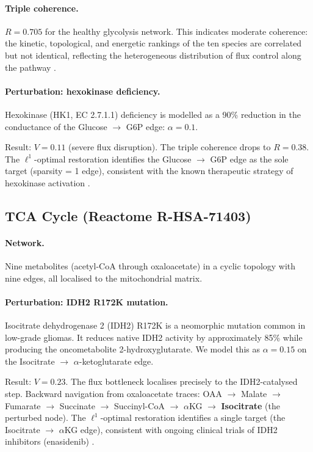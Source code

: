 \documentclass[11pt,twocolumn]{article}
\theoremstyle{plain}
\theoremstyle{definition}
\begin{document}
\paragraph{Triple coherence.}
$R = 0.705$ for the healthy glycolysis network. This indicates moderate
coherence: the kinetic, topological, and energetic rankings of the ten species
are correlated but not identical, reflecting the heterogeneous distribution of
flux control along the pathway \cite{kacser1973control, fell1992metabolic}.

\paragraph{Perturbation: hexokinase deficiency.}
Hexokinase (HK1, EC 2.7.1.1) deficiency is modelled as a 90\% reduction in
the conductance of the Glucose $\to$ G6P edge: $\alpha = 0.1$.

Result: $V = 0.11$ (severe flux disruption). The triple coherence drops to
$R = 0.38$. The $\ell^1$-optimal restoration identifies the Glucose $\to$ G6P
edge as the sole target (sparsity = 1 edge), consistent with the known
therapeutic strategy of hexokinase activation
\cite{csermely2013structure}.

\subsection{TCA Cycle (Reactome R-HSA-71403)}

\paragraph{Network.} Nine metabolites (acetyl-CoA through oxaloacetate) in a
cyclic topology with nine edges, all localised to the mitochondrial matrix.

\paragraph{Perturbation: IDH2 R172K mutation.}
Isocitrate dehydrogenase 2 (IDH2) R172K is a neomorphic mutation common in
low-grade gliomas. It reduces native IDH2 activity by approximately 85\% while
producing the oncometabolite 2-hydroxyglutarate. We model this as $\alpha = 0.15$
on the Isocitrate $\to$ $\alpha$-ketoglutarate edge.

Result: $V = 0.23$. The flux bottleneck localises precisely to the IDH2-catalysed
step. Backward navigation from oxaloacetate traces: OAA $\to$ Malate $\to$
Fumarate $\to$ Succinate $\to$ Succinyl-CoA $\to$ $\alpha$KG $\to$
\textbf{Isocitrate} (the perturbed node). The $\ell^1$-optimal restoration
identifies a single target (the Isocitrate $\to$ $\alpha$KG edge), consistent
with ongoing clinical trials of IDH2 inhibitors (enasidenib)
\cite{barabasi2011network}.
\end{document}
